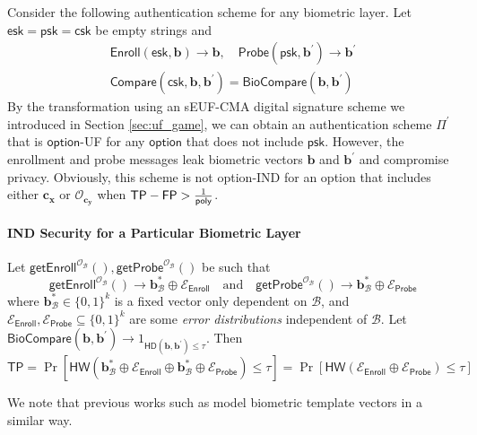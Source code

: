 Consider the following authentication scheme for any biometric layer. Let $\textsf{esk} = \textsf{psk} = \textsf{csk}$ be empty strings and
\begin{gather*}
	\textsf{Enroll}(\textsf{esk}, \mathbf{b}) \to \mathbf{b}, \quad \textsf{Probe}(\textsf{psk}, \mathbf{b}^\prime ) \to \mathbf{b}^\prime \\
	\textsf{Compare}(\textsf{csk}, \mathbf{b}, \mathbf{b}^\prime) = \textsf{BioCompare}(\mathbf{b}, \mathbf{b}^\prime ) 
\end{gather*}
By the transformation using an sEUF-CMA digital signature scheme we introduced in Section \ref{sec:uf_game}, we can obtain an authentication scheme $\Pi^\prime$ that is $\textsf{option}$-UF for any $\textsf{option}$ that does not include $\textsf{psk}$.
However, the enrollment and probe messages leak biometric vectors $\mathbf{b}$ and $\mathbf{b}^\prime$ and compromise privacy. Obviously, this scheme is not \textsf{option}-IND for an \textsf{option} that includes either $\mathbf{c_x}$ or $\mathcal{O}_{\mathbf{c_y}}$ when $\textsf{TP} - \textsf{FP} > \frac{1}{\mathsf{poly}}$.

\paragraph{IND Security for a Particular Biometric Layer}

Let $\textsf{getEnroll}^{\mathcal{O}_{\mathcal{B}}}(), \textsf{getProbe}^{\mathcal{O}_{\mathcal{B}}}()$ be such that
\[
	\textsf{getEnroll}^{\mathcal{O}_{\mathcal{B}}}() \to \mathbf{b}^*_{\mathcal{B}} \oplus \mathcal{E}_{\textsf{Enroll}}  \quad \text{and} \quad \textsf{getProbe}^{\mathcal{O}_{\mathcal{B}}}() \to \mathbf{b}^*_{\mathcal{B}} \oplus \mathcal{E}_{\textsf{Probe}}
\]
where $\mathbf{b}^*_{\mathcal{B}} \in \{0, 1\}^k$ is a fixed vector only dependent on $\mathcal{B}$, and $\mathcal{E}_{\textsf{Enroll}}, \mathcal{E}_{\textsf{Probe}} \subseteq \{0, 1\}^k$ are some \emph{error distributions} independent of $\mathcal{B}$. Let $\textsf{BioCompare}(\mathbf{b}, \mathbf{b}^\prime) \to 1_{\textsf{HD}(\mathbf{b}, \mathbf{b}^\prime) \leq \tau}$. Then
\[
	\textsf{TP} = \Pr[ \textsf{HW}(\mathbf{b}^*_{\mathcal{B}} \oplus \mathcal{E}_{\textsf{Enroll}} \oplus \mathbf{b}^*_{\mathcal{B}} \oplus \mathcal{E}_{\textsf{Probe}}) \leq \tau ] = \Pr[ \textsf{HW}(\mathcal{E}_{\textsf{Enroll}} \oplus \mathcal{E}_{\textsf{Probe}}) \leq \tau ]
\]

\noindent We note that previous works such as \cite{10.1145/1030083.1030096,cryptoeprint:2014/394} model biometric template vectors in a similar way.

